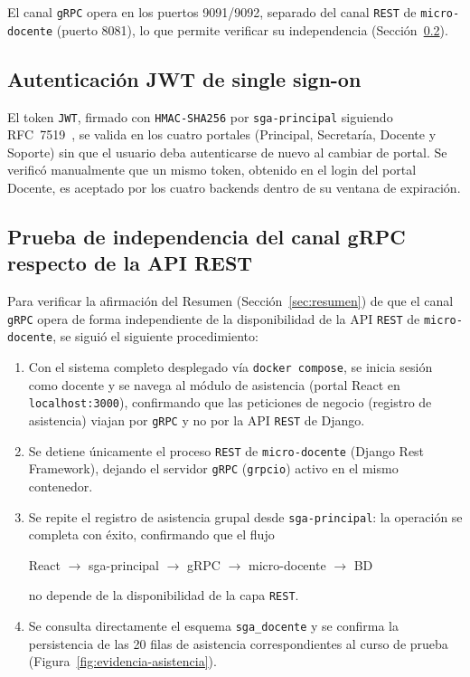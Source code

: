 \documentclass[12pt,a4paper]{article}
\newcommand{\flujo}[1]{%
  \begin{center}
  \small\ttfamily #1
  \end{center}%
}
\begin{document}
El canal \texttt{gRPC} opera en los puertos 9091/9092, separado del canal
\texttt{REST} de \texttt{micro-docente} (puerto 8081), lo que permite
verificar su independencia (Sección~\ref{sec:prueba-independencia}).

\subsection{Autenticación JWT de single sign-on}

El token \texttt{JWT}, firmado con \texttt{HMAC-SHA256} por
\texttt{sga-principal} siguiendo RFC~7519~\cite{jones2015jwt}, se valida en
los cuatro portales (Principal, Secretaría, Docente y Soporte) sin que el
usuario deba autenticarse de nuevo al cambiar de portal. Se verificó
manualmente que un mismo token, obtenido en el login del portal Docente,
es aceptado por los cuatro backends dentro de su ventana de expiración.

\subsection{Prueba de independencia del canal gRPC respecto de la API REST}
\label{sec:prueba-independencia}

Para verificar la afirmación del Resumen (Sección~\ref{sec:resumen}) de que
el canal \texttt{gRPC} opera de forma independiente de la disponibilidad de
la API \texttt{REST} de \texttt{micro-docente}, se siguió el siguiente
procedimiento:

\begin{enumerate}
  \item Con el sistema completo desplegado vía \texttt{docker compose},
        se inicia sesión como docente y se navega al módulo de asistencia
        (portal React en \texttt{localhost:3000}), confirmando que las
        peticiones de negocio (registro de asistencia) viajan por
        \texttt{gRPC} y no por la API \texttt{REST} de Django.
  \item Se detiene únicamente el proceso \texttt{REST} de
        \texttt{micro-docente} (Django Rest Framework), dejando el
        servidor \texttt{gRPC} (\texttt{grpcio}) activo en el mismo
        contenedor.
  \item Se repite el registro de asistencia grupal desde
        \texttt{sga-principal}: la operación se completa con éxito,
        confirmando que el flujo

        \flujo{React $\to$ sga-principal $\to$ gRPC $\to$ micro-docente $\to$ BD}

        \noindent no depende de la disponibilidad de la capa \texttt{REST}.
  \item Se consulta directamente el esquema \texttt{sga\_docente} y se
        confirma la persistencia de las 20 filas de asistencia
        correspondientes al curso de prueba (Figura~\ref{fig:evidencia-asistencia}).
\end{enumerate}
\end{document}
